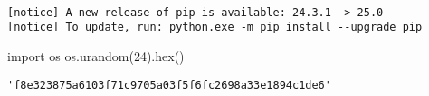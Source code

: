 \documentclass[
  letterpaper,
  DIV=11,
  numbers=noendperiod]{scrreprt}
\newenvironment{Shaded}{\begin{snugshade}}{\end{snugshade}}
\newcommand{\BuiltInTok}[1]{\textcolor[rgb]{0.00,0.23,0.31}{#1}}
\newcommand{\DecValTok}[1]{\textcolor[rgb]{0.68,0.00,0.00}{#1}}
\newcommand{\ImportTok}[1]{\textcolor[rgb]{0.00,0.46,0.62}{#1}}
\newcommand{\NormalTok}[1]{\textcolor[rgb]{0.00,0.23,0.31}{#1}}
\begin{document}
\begin{verbatim}

[notice] A new release of pip is available: 24.3.1 -> 25.0
[notice] To update, run: python.exe -m pip install --upgrade pip
\end{verbatim}

\begin{Shaded}
\begin{Highlighting}[]
\ImportTok{import}\NormalTok{ os}
\NormalTok{os.urandom(}\DecValTok{24}\NormalTok{).}\BuiltInTok{hex}\NormalTok{()}
\end{Highlighting}
\end{Shaded}

\begin{verbatim}
'f8e323875a6103f71c9705a03f5f6fc2698a33e1894c1de6'
\end{verbatim}
\end{document}
